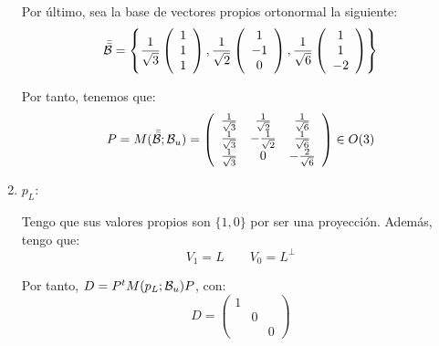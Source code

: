 \begin{ejercicio}
\begin{enumerate}
        Por último, sea la base de vectores propios ortonormal la siguiente:
        \begin{equation*}
            \bar{\bar{\mathcal{B}}}=\left\{
                \frac{1}{\sqrt{3}}\left(\begin{array}{c}
                     1 \\ 1 \\ 1
                \end{array}\right),
                \frac{1}{\sqrt{2}}\left(\begin{array}{c}
                     1 \\ -1 \\ 0
                \end{array} \right),
                \frac{1}{\sqrt{6}}\left(\begin{array}{c}
                     1 \\ 1 \\ -2
                \end{array} \right)\right\}
        \end{equation*}

        Por tanto, tenemos que:
        \begin{equation*}
            P=M(\bar{\bar{\mathcal{B}}};\mathcal{B}_u)=\left(\begin{array}{ccc}
                \frac{1}{\sqrt{3}} & \frac{1}{\sqrt{2}} & \frac{1}{\sqrt{6}}\\
                \frac{1}{\sqrt{3}} & -\frac{1}{\sqrt{2}} &\frac{1}{\sqrt{6}}\\
                \frac{1}{\sqrt{3}} & 0& -\frac{2}{\sqrt{6}}\\
            \end{array}\right) \in O(3)
        \end{equation*}



        \item $p_L$:

        Tengo que sus valores propios son $\{1, 0\}$ por ser una proyección. Además, tengo que:
        \begin{equation*}
            V_1=L \qquad V_{0}=L^\perp
        \end{equation*}

        Por tanto, $D=P^tM(p_L;\mathcal{B}_u)P$, con:
        \begin{equation*}
            D=\left(\begin{array}{ccc}
                1 &  \\
                 & 0 \\
                 && 0
            \end{array}\right)
        \end{equation*}


\end{enumerate}
\end{ejercicio}
